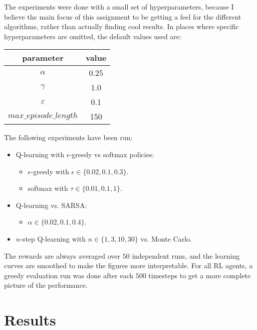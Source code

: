 \documentclass{article}
\begin{document}
The experiments were done with a small set of hyperparameters, because I believe the main focus of this assignment to be getting a feel for the different algorithms, rather than actually finding cool results.
In places where specific hyperparameters are omitted, the default values used are:

\begin{center}
    \begin{tabular}{|c|c|}
        \toprule
        parameter & value \\
        \midrule
        $\alpha$ & 0.25 \\
        $\gamma$ & 1.0 \\
        $\varepsilon$ & 0.1 \\
        $max\_episode\_length$ & 150 \\
        \bottomrule
    \end{tabular}
\end{center}

The following experiments have been run:

\begin{itemize}
    \item Q-learning with $\epsilon$-greedy vs softmax policies:
    \begin{itemize}
        \item $\epsilon$-greedy with $\epsilon \in \{0.02, 0.1, 0.3\}$.
        \item softmax with $\tau \in \{0.01, 0.1, 1\}$.
    \end{itemize}
    \item Q-learning vs. SARSA:
    \begin{itemize}
        \item $\alpha \in \{0.02, 0.1, 0.4\}$.
    \end{itemize}
    \item $n$-step Q-learning with $n \in \{1, 3, 10, 30\}$ vs. Monte Carlo.
\end{itemize}

The rewards are always averaged over $50$ independent runs, and the learning curves are smoothed to make the figures more interpretable.
For all RL agents, a greedy evaluation run was done after each $500$ timesteps to get a more complete picture of the performance.


\section{Results}
\label{sec:results}
\end{document}
